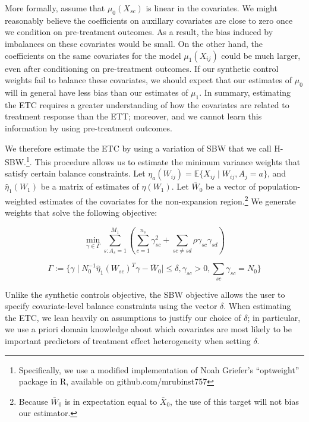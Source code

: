 \documentclass[12pt]{article}
\begin{document}
More formally, assume that $\mu_0(X_{sc})$ is linear in the covariates. We might reasonably believe the coefficients on auxillary covariates are close to zero once we condition on pre-treatment outcomes. As a result, the bias induced by imbalances on these covariates would be small. On the other hand, the coefficients on the same covariates for the model $\mu_1(X_{ij})$ could be much larger, even after conditioning on pre-treatment outcomes. If our synthetic control weights fail to balance these covariates, we should expect that our estimates of $\mu_0$ will in general have less bias than our estimates of $\mu_1$. In summary, estimating the ETC requires a greater understanding of how the covariates are related to treatment response than the ETT; moreover, and we cannot learn this information by using pre-treatment outcomes.

We therefore estimate the ETC by using a variation of SBW that we call H-SBW.\footnote{Specifically, we use a modified implementation of Noah Griefer's ``optweight'' package in R, available on github.com/mrubinst757}. This procedure allows us to estimate the minimum variance weights that satisfy certain balance constraints. Let $\eta_a(W_{ij}) = \mathbb{E}\{X_{ij} \mid W_{ij}, A_j = a\}$, and $\hat{\eta}_1(W_1)$ be a matrix of estimates of $\eta(W_1)$. Let $\bar{W}_0$ be a vector of population-weighted estimates of the covariates for the non-expansion region.\footnote{Because $\bar{W}_0$ is in expectation equal to $\bar{X}_0$, the use of this target will not bias our estimator.} We generate weights that solve the following objective:

$$
\min_{\gamma \in \Gamma} \sum_{s: A_s = 1}^{M_1}(\sum_{c = 1}^{n_s} \gamma_{sc}^2 + \sum_{sc \ne sd}\rho \gamma_{sc}\gamma_{sd})
$$

$$
\Gamma := \{\gamma \mid N_0^{-1}\hat{\eta}_1(W_{sc})^T\gamma - \bar{W}_0 \mid \le \delta, \gamma_{sc} > 0, \sum_{sc}\gamma_{sc} = N_0\}
$$

Unlike the synthetic controls objective, the SBW objective allows the user to specify covariate-level balance constraints using the vector $\delta$. When estimating the ETC, we lean heavily on assumptions to justify our choice of $\delta$; in particular, we use a priori domain knowledge about which covariates are most likely to be important predictors of treatment effect heterogeneity when setting $\delta$. 
\end{document}
